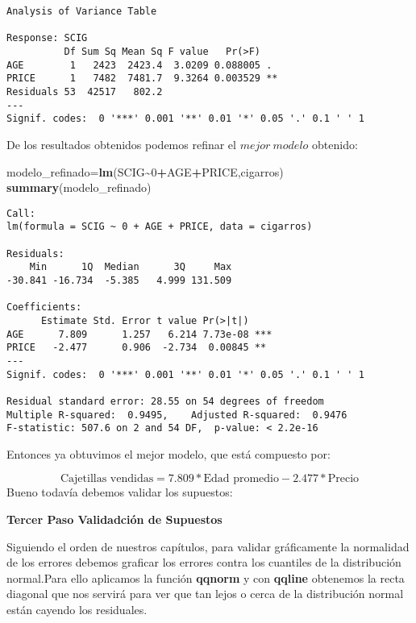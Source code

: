 \documentclass[
  a4paper,
  oneside,
  openany]{book}
\newenvironment{Shaded}{\begin{snugshade}}{\end{snugshade}}
\newcommand{\DecValTok}[1]{\textcolor[rgb]{0.00,0.00,0.81}{#1}}
\newcommand{\KeywordTok}[1]{\textcolor[rgb]{0.13,0.29,0.53}{\textbf{#1}}}
\newcommand{\NormalTok}[1]{#1}
\newcommand{\OperatorTok}[1]{\textcolor[rgb]{0.81,0.36,0.00}{\textbf{#1}}}
\begin{document}
\begin{verbatim}
Analysis of Variance Table

Response: SCIG
          Df Sum Sq Mean Sq F value   Pr(>F)   
AGE        1   2423  2423.4  3.0209 0.088005 . 
PRICE      1   7482  7481.7  9.3264 0.003529 **
Residuals 53  42517   802.2                    
---
Signif. codes:  0 '***' 0.001 '**' 0.01 '*' 0.05 '.' 0.1 ' ' 1
\end{verbatim}

De los resultados obtenidos podemos refinar el \(mejor \ modelo\) obtenido:

\begin{Shaded}
\begin{Highlighting}[]
\NormalTok{modelo\_refinado=}\KeywordTok{lm}\NormalTok{(SCIG}\OperatorTok{\textasciitilde{}}\DecValTok{0}\OperatorTok{+}\NormalTok{AGE}\OperatorTok{+}\NormalTok{PRICE,cigarros)}
\KeywordTok{summary}\NormalTok{(modelo\_refinado)}
\end{Highlighting}
\end{Shaded}

\begin{verbatim}
Call:
lm(formula = SCIG ~ 0 + AGE + PRICE, data = cigarros)

Residuals:
    Min      1Q  Median      3Q     Max 
-30.841 -16.734  -5.385   4.999 131.509 

Coefficients:
      Estimate Std. Error t value Pr(>|t|)    
AGE      7.809      1.257   6.214 7.73e-08 ***
PRICE   -2.477      0.906  -2.734  0.00845 ** 
---
Signif. codes:  0 '***' 0.001 '**' 0.01 '*' 0.05 '.' 0.1 ' ' 1

Residual standard error: 28.55 on 54 degrees of freedom
Multiple R-squared:  0.9495,    Adjusted R-squared:  0.9476 
F-statistic: 507.6 on 2 and 54 DF,  p-value: < 2.2e-16
\end{verbatim}

Entonces ya obtuvimos el mejor modelo, que está compuesto por:

\[\mbox{Cajetillas vendidas}= 7.809*\mbox{Edad promedio}-2.477*\mbox{Precio}\]
Bueno todavía debemos validar los supuestos:

\textbf{Tercer Paso Validadción de Supuestos}

Siguiendo el orden de nuestros capítulos, para validar gráficamente la normalidad de los errores debemos graficar los errores contra los cuantiles de la distribución normal.Para ello aplicamos la función \textbf{qqnorm} y con \textbf{qqline} obtenemos la recta diagonal que nos servirá para ver que tan lejos o cerca de la distribución normal están cayendo los residuales.
\end{document}
